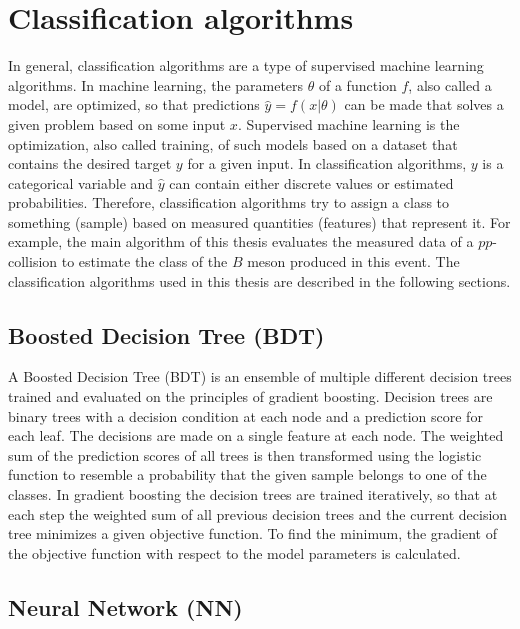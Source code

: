 \section{Classification algorithms}

In general, classification algorithms are a type of supervised machine learning algorithms.
In machine learning, the parameters $\theta$ of a function $f$, also called a model, are optimized, so that predictions $\hat{y}=f(x|\theta)$ can be made that solves a given problem based on some input $x$.
Supervised machine learning is the optimization, also called training, of such models based on a dataset that contains the desired target $y$ for a given input. 
In classification algorithms, $y$ is a categorical variable and $\hat{y}$ can contain either discrete values or estimated probabilities. 
Therefore, classification algorithms try to assign a class to something (sample) based on measured quantities (features) that represent it.
For example, the main algorithm of this thesis evaluates the measured data of a $pp$-collision to estimate the class of the $B$ meson produced in this event.
The classification algorithms used in this thesis are described in the following sections.

\subsection{Boosted Decision Tree (BDT)}
\label{sec:BDT}

A Boosted Decision Tree (BDT) is an ensemble of multiple different decision trees trained and evaluated on the principles of gradient boosting.
Decision trees are binary trees with a decision condition at each node and a prediction score for each leaf.
The decisions are made on a single feature at each node.
The weighted sum of the prediction scores of all trees is then transformed using the logistic function to resemble a probability that the given sample belongs to one of the classes.
In gradient boosting the decision trees are trained iteratively, so that at each step the weighted sum of all previous decision trees and the current decision tree minimizes a given objective function.
To find the minimum, the gradient of the objective function with respect to the model parameters is calculated.

\subsection{Neural Network (NN)}
\label{sec:NN}

